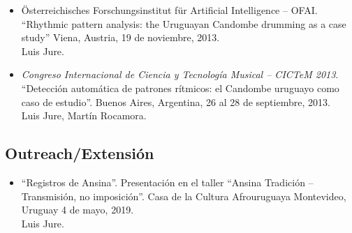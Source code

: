 \documentclass[a4paper]{article}
\begin{document}
\begin{itemize}
\item[ ]	%
Österreichisches Forschungsinstitut für Artificial Intelligence -- OFAI.
``Rhythmic pattern analysis: the Uruguayan Candombe drumming as a case study''
Viena, Austria, 19 de noviembre, 2013.\\
Luis Jure.

\item[ ]	%
\emph{Congreso Internacional de Ciencia y Tecnología Musical -- CICTeM 2013}.
``Detección automática de patrones rítmicos: el Candombe uruguayo como caso de estudio''.
Buenos Aires, Argentina, 26 al 28 de septiembre, 2013.\\
Luis Jure, Martín Rocamora.

\end{itemize}

\subsection*{Outreach/Extensión}

\begin{itemize}

\item[]	%
``Registros de Ansina''.
Presentación en el taller ``Ansina Tradición -- Transmisión, no imposición''.
Casa de la Cultura Afrouruguaya 
Montevideo, Uruguay 4 de mayo, 2019.\\
Luis Jure.

\end{itemize}
\end{document}
